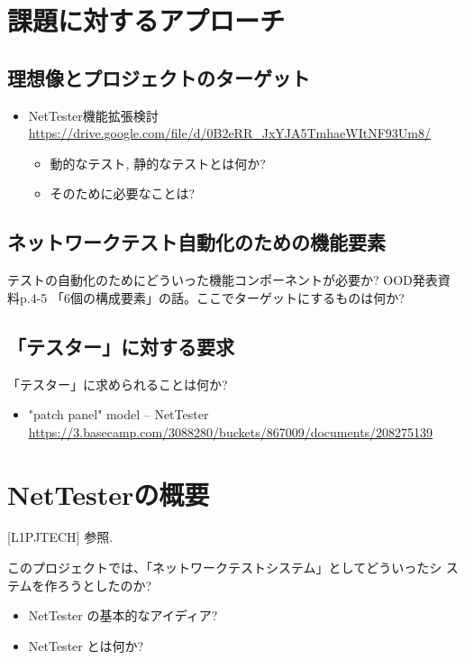 \section{課題に対するアプローチ}

\subsection{理想像とプロジェクトのターゲット}


\begin{itemize}
 \item NetTester機能拡張検討 \url{https://drive.google.com/file/d/0B2eRR_JxYJA5TmhaeWItNF93Um8/}
       \begin{itemize}
        \item 動的なテスト, 静的なテストとは何か?
        \item そのために必要なことは?
       \end{itemize}
\end{itemize}

\subsection{ネットワークテスト自動化のための機能要素}

テストの自動化のためにどういった機能コンポーネントが必要か?
OOD発表資料p.4-5 「6個の構成要素」の話。ここでターゲットにするものは何か?

\subsection{「テスター」に対する要求}

「テスター」に求められることは何か?
\begin{itemize}
 \item "patch panel" model – NetTester \url{https://3.basecamp.com/3088280/buckets/867009/documents/208275139}
\end{itemize}

\section{NetTesterの概要}

[L1PJTECH] 参照.

このプロジェクトでは、「ネットワークテストシステム」としてどういったシ
ステムを作ろうとしたのか?

\begin{itemize}
 \item NetTester の基本的なアイディア?
 \item NetTester とは何か?
\end{itemize}

